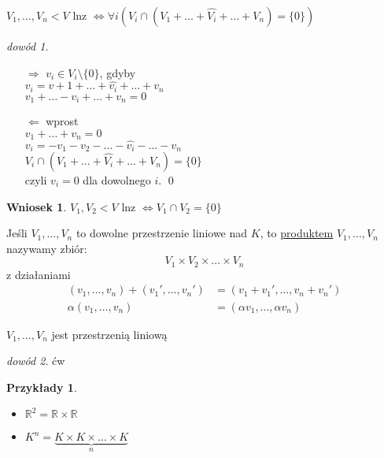 \documentclass[10pt]{article}
\theoremstyle{definition}
\theoremstyle{definition}
\theoremstyle{definition}
\theoremstyle{definition}
\theoremstyle{remark}
\newtheorem*{dd}{dowód}
\theoremstyle{definition}
\theoremstyle{definition}
\newtheorem*{wn}{Wniosek}
\theoremstyle{definition}
\theoremstyle{definition}
\theoremstyle{definition}
\newtheorem*{przy}{Przykłady}
\begin{document}
\begin{lem}
    $V_1,\ldots,V_n < V$ lnz $\Leftrightarrow \forall i (V_i \cap (V_1+\ldots+\widehat{V_i} + \ldots + V_n) = \{0\})$
    \begin{dd} \hfill 
        \begin{itemize} 
            \item[$\Rightarrow$] $v_i \in V_i \setminus \{0\}$, gdyby \\ 
                $v_i = v+1 + \ldots + \widehat{v_i} + \ldots + v_n$ \\ 
                $v_1 + \ldots - v_i + \ldots + v_n = 0$ \hfill \lightning
            \item[$\Leftarrow$] wprost \\ 
                $v_1 + \ldots + v_n = 0$ \\ 
                $v_i = -v_1 - v_2 - \ldots - \widehat{v_i} - \ldots - v_n$ \\ 
                $V_i \cap (V_1 + \ldots + \widehat{V_i}+ \ldots + V_n) = \{0\}$ \\ 
                czyli $v_i = 0 $ dla dowolnego $i$. \hfill \qed
        \end{itemize}
    \end{dd} 
\end{lem}
\begin{wn} 
    $V_1,V_2 < V$ lnz $\Leftrightarrow V_1 \cap V_2 = \{0\}$
\end{wn} 
\begin{df} 
    Jeśli $V_1,\ldots,V_n$ to dowolne przestrzenie liniowe nad $K$, to \underline{produktem} $V_1,\ldots,V_n$ 
    nazywamy zbiór: 
        \[ V_1 \times V_2 \times \ldots \times V_n \] 
     z działaniami 
     \begin{align*} 
        (v_1,\ldots,v_n)+(v_1',\ldots,v_n') &= (v_1 + v_1',\ldots,v_n+v_n') \\ 
        \alpha (v_1,\ldots,v_n) &= (\alpha v_1,\ldots,\alpha v_n)
    \end{align*}
\end{df} 
\begin{ft} 
    $V_1,\ldots,V_n$ jest przestrzenią liniową
\end{ft} 
\begin{dd} 
    ćw 
\end{dd} 
\begin{przy} \hfill 
    \begin{itemize} 
        \item $\mathbb R^2 = \mathbb R \times \mathbb R$
        \item $K^n = \underbrace{K \times K \times \ldots \times K}_{n}$
    \end{itemize} 
\end{przy} 
\end{document}
